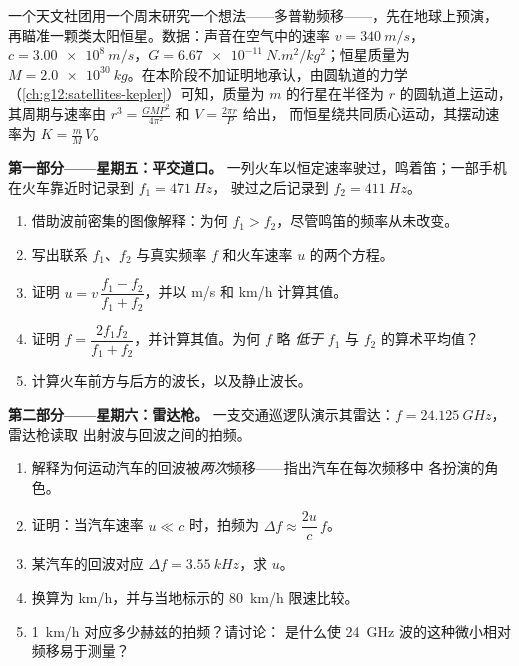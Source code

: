\begin{problem}
\label{pb:g12:doppler-effect:1}
一个天文社团用一个周末研究一个想法——多普勒频移——，先在地球上预演，
再瞄准一颗类太阳恒星。数据：声音在空气中的速率 $v = \qty{340}{m/s}$，
$c = \qty{3.00e8}{m/s}$，$G = \qty{6.67e-11}{N.m^2/kg^2}$；恒星质量为
$M = \qty{2.0e30}{kg}$。在本阶段不加证明地承认，由圆轨道的力学
（\cref{ch:g12:satellites-kepler}）可知，质量为 $m$ 的行星在半径为 $r$ 的圆轨道上运动，
其周期与速率由 $r^3 = \frac{G M P^2}{4\pi^2}$ 和 $V = \frac{2\pi r}{P}$ 给出，
而恒星绕共同质心运动，其摆动速率为 $K = \frac{m}{M}\,V$。

\medskip
\noindent\textbf{第一部分——星期五：平交道口。}
一列火车以恒定速率驶过，鸣着笛；一部手机在火车靠近时记录到 $f_1 = \qty{471}{Hz}$，
驶过之后记录到 $f_2 = \qty{411}{Hz}$。
\begin{enumerate}
  \item 借助波前密集的图像解释：为何 $f_1 > f_2$，尽管鸣笛的频率从未改变。
  \item 写出联系 $f_1$、$f_2$ 与真实频率 $f$ 和火车速率 $u$ 的两个方程。
  \item 证明 $u = v\,\dfrac{f_1 - f_2}{f_1 + f_2}$，并以 \unit{m/s} 和 \unit{km/h} 计算其值。
  \item 证明 $f = \dfrac{2 f_1 f_2}{f_1 + f_2}$，并计算其值。为何 $f$ 略
        \emph{低于} $f_1$ 与 $f_2$ 的算术平均值？
  \item 计算火车前方与后方的波长，以及静止波长。
\end{enumerate}

\medskip
\noindent\textbf{第二部分——星期六：雷达枪。}
一支交通巡逻队演示其雷达：$f = \qty{24.125}{GHz}$，雷达枪读取
出射波与回波之间的拍频。
\begin{enumerate}[resume]
  \item 解释为何运动汽车的回波被\emph{两次}频移——指出汽车在每次频移中
        各扮演的角色。
  \item 证明：当汽车速率 $u \ll c$ 时，拍频为 $\Delta f \approx \dfrac{2u}{c}\,f$。
  \item 某汽车的回波对应 $\Delta f = \qty{3.55}{kHz}$，求 $u$。
  \item 换算为 \unit{km/h}，并与当地标示的 \qty{80}{km/h} 限速比较。
  \item \qty{1}{km/h} 对应多少赫兹的拍频？请讨论：
        是什么使 \qty{24}{GHz} 波的这种微小相对频移易于测量？
\end{enumerate}


\end{problem}
